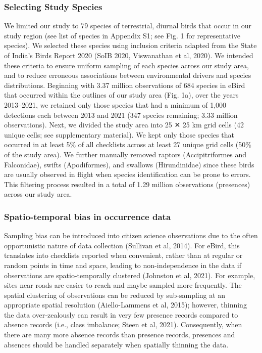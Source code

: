 \subsubsection*{Selecting Study Species}

We limited our study to 79 species of terrestrial, diurnal birds that occur in our study region (see list of species in Appendix S1; see Fig.
1 for representative species).
We selected these species using inclusion criteria adapted from the State of India's Birds Report 2020 (SoIB 2020, Viswanathan et al, 2020).
We intended these criteria to ensure uniform sampling of each species across our study area, and to reduce erroneous associations between environmental drivers and species distributions.
Beginning with 3.37 million observations of 684 species in eBird that occurred within the outlines of our study area (Fig.
1a), over the years 2013–2021, we retained only those species that had a minimum of 1,000 detections each between 2013 and 2021 (347 species remaining; 3.33 million observations).
Next, we divided the study area into 25 ✕ 25 km grid cells (42 unique cells; see supplementary material).
We kept only those species that occurred in at least 5\% of all checklists across at least 27 unique grid cells (50\% of the study area).
We further manually removed raptors (Accipitriformes and Falconidae), swifts (Apodiformes), and swallows (Hirundinidae) since these birds are usually observed in flight when species identification can be prone to errors.
This filtering process resulted in a total of 1.29 million observations (presences) across our study area.

\subsubsection*{Spatio-temporal bias in occurrence data}

Sampling bias can be introduced into citizen science observations due to the often opportunistic nature of data collection (Sullivan et al, 2014).
For eBird, this translates into checklists reported when convenient, rather than at regular or random points in time and space, leading to non-independence in the data if observations are spatio-temporally clustered (Johnston et al, 2021).
For example, sites near roads are easier to reach and maybe sampled more frequently.
The spatial clustering of observations can be reduced by sub-sampling at an appropriate spatial resolution (Aiello-Lammens et al, 2015); however, thinning the data over-zealously can result in very few presence records compared to absence records (i.e., class imbalance; Steen et al, 2021).
Consequently, when there are many more absence records than presence records, presences and absences should be handled separately when spatially thinning the data.

